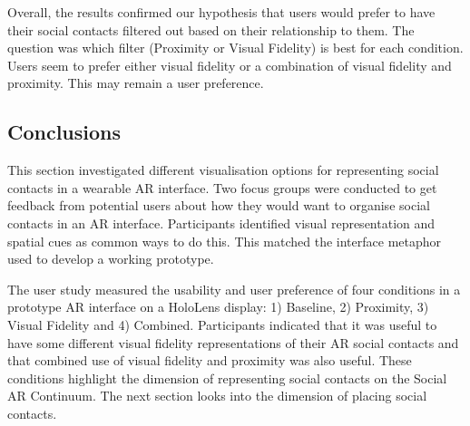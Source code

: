 Overall, the results confirmed our hypothesis that users would prefer to have their social contacts filtered out based on their relationship to them. The question was which filter (Proximity or Visual Fidelity) is best for each condition. Users seem to prefer either visual fidelity or a combination of visual fidelity and proximity. This may remain a user preference. 


\subsection{Conclusions}

This section investigated different visualisation options for representing social contacts in a wearable AR interface. Two focus groups were conducted to get feedback from potential users about how they would want to organise social contacts in an AR interface. Participants identified visual representation and spatial cues as common ways to do this. This matched the interface metaphor used to develop a working prototype.

The user study measured the usability and user preference of four conditions in a prototype AR interface on a HoloLens display: 1) Baseline, 2) Proximity, 3) Visual Fidelity and 4) Combined. Participants indicated that it was useful to have some different visual fidelity representations of their AR social contacts and that combined use of visual fidelity and proximity was also useful. These conditions highlight the dimension of representing social contacts on the Social AR Continuum. The next section looks into the dimension of placing social contacts. 

